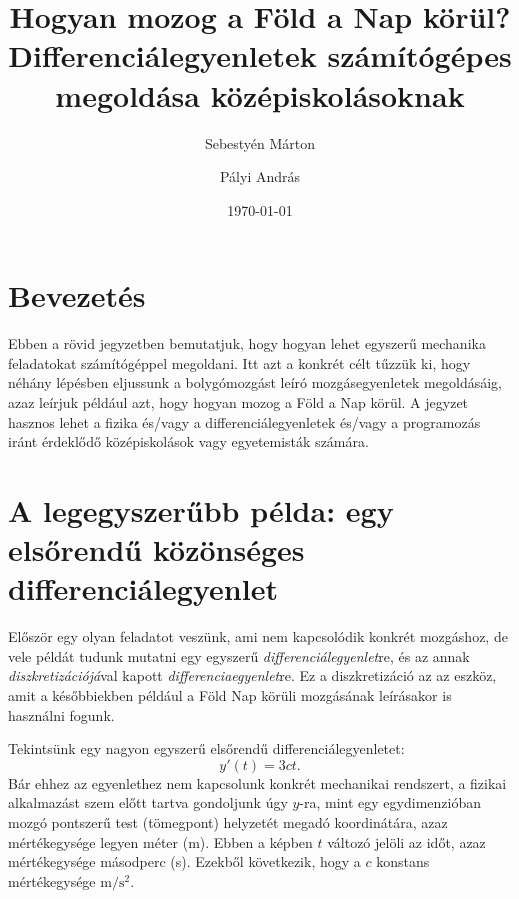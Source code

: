 \documentclass[%
 reprint,onecolumn,
 amsmath,amssymb,
 aps,
]{revtex4-2}
\begin{document}
\title{Hogyan mozog a Föld a Nap körül? \\
Differenciálegyenletek számítógépes megoldása 
középiskolásoknak}

\author{Sebestyén Márton}

\author{Pályi András}

\date{\today}



\maketitle

\tableofcontents

\section{Bevezetés}

Ebben a rövid jegyzetben bemutatjuk, hogy hogyan
lehet egyszerű mechanika feladatokat számítógéppel
megoldani. 
Itt azt a konkrét célt tűzzük ki, hogy néhány lépésben 
eljussunk a bolygómozgást leíró mozgásegyenletek
megoldásáig, azaz leírjuk például azt, hogy hogyan
mozog a Föld a Nap körül.
A jegyzet hasznos lehet a fizika és/vagy a 
differenciálegyenletek és/vagy a programozás 
iránt érdeklődő középiskolások vagy
egyetemisták számára.


\section{A legegyszerűbb példa: egy elsőrendű közönséges
differenciálegyenlet}

Először egy olyan feladatot veszünk, ami
nem kapcsolódik konkrét mozgáshoz, de 
vele példát tudunk mutatni
egy egyszerű \emph{differenciálegyenlet}re,
és az annak \emph{diszkretizációjá}val kapott
\emph{differenciaegyenlet}re.
Ez a diszkretizáció az az eszköz, amit a későbbiekben
például a Föld Nap körüli mozgásának leírásakor
is használni fogunk. 

Tekintsünk egy nagyon egyszerű
elsőrendű differenciálegyenletet:
\begin{equation}
\label{eq:elsorendupelda}
    y'(t) = 3 c t.
\end{equation}
Bár ehhez az egyenlethez 
nem kapcsolunk konkrét mechanikai
rendszert, a fizikai alkalmazást szem előtt
tartva 
gondoljunk úgy $y$-ra, mint egy 
egydimenzióban mozgó pontszerű
test (tömegpont) helyzetét megadó koordinátára,
azaz mértékegysége legyen méter (m).
Ebben a képben $t$ változó jelöli az időt, 
azaz mértékegysége másodperc (s).
Ezekből következik, hogy a $c$ konstans
mértékegysége $\text{m}/\text{s}^2$.
\end{document}
